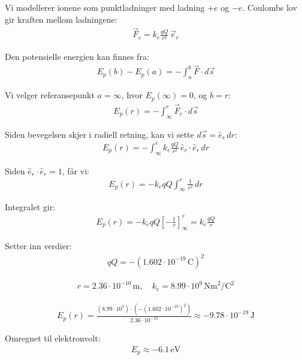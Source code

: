 \subsubsection{}

Vi modellerer ionene som punktladninger med ladning $+e$ og $-e$. Coulombs lov gir kraften mellom ladningene:
\begin{align}
\vec{F}_c = k_e \frac{qQ}{r^2} \,\vec{e}_r
\end{align}

Den potensielle energien kan finnes fra:
\begin{align}
E_p(b) - E_p(a) = - \int_a^b \vec{F} \cdot d\vec{s}
\end{align}

Vi velger referansepunkt $a = \infty$, hvor $E_p(\infty) = 0$, og $b = r$:
\begin{align}
E_p(r) = - \int_{\infty}^{r} \vec{F}_c \cdot d\vec{s}
\end{align}

Siden bevegelsen skjer i radiell retning, kan vi sette $d\vec{s} = \hat{e}_r \, dr$:
\begin{align}
E_p(r) = - \int_{\infty}^{r} k_e \frac{qQ}{r^2} \,\hat{e}_r \cdot \hat{e}_r \, dr
\end{align}

Siden $\hat{e}_r \cdot \hat{e}_r = 1$, får vi:
\begin{align}
E_p(r) = - k_e qQ \int_{\infty}^{r} \frac{1}{r^2} \, dr
\end{align}

Integralet gir:
\begin{align}
E_p(r) = - k_e qQ \left[ -\frac{1}{r} \right]_{\infty}^{r} = k_e \frac{qQ}{r}
\end{align}

Setter inn verdier:
\begin{align}
qQ = -(1.602 \cdot 10^{-19}\,\text{C})^2
\end{align}

\begin{align}
r = 2.36 \cdot 10^{-10}\,\text{m}, \quad k_e = 8.99 \cdot 10^9\,\text{Nm}^2/\text{C}^2
\end{align}

\begin{align}
E_p(r) = \frac{(8.99 \cdot 10^9)\cdot (-(1.602 \cdot 10^{-19})^2)}{2.36 \cdot 10^{-10}}
\approx -9.78 \cdot 10^{-19}\,\text{J}
\end{align}

Omregnet til elektronvolt:
\begin{align}
E_p \approx -6.1\,\text{eV}
\end{align}

\newpage